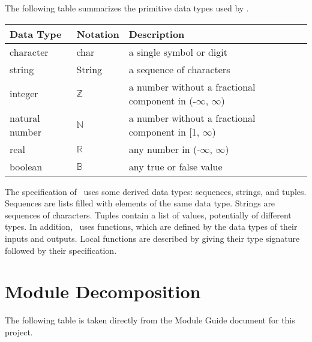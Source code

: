 \documentclass[12pt, titlepage]{article}
\begin{document}
The following table summarizes the primitive data types used by \progname. 

\begin{center}
\renewcommand{\arraystretch}{1.2}
\noindent 
\begin{tabular}{l l p{7.5cm}} 
\toprule 
\textbf{Data Type} & \textbf{Notation} & \textbf{Description}\\ 
\midrule
character & char & a single symbol or digit\\
string & String & a sequence of characters\\
integer & $\mathbb{Z}$ & a number without a fractional component in (-$\infty$, $\infty$) \\
natural number & $\mathbb{N}$ & a number without a fractional component in [1, $\infty$) \\
real & $\mathbb{R}$ & any number in (-$\infty$, $\infty$)\\
boolean & $\mathbb{B}$ & any true or false value\\
\bottomrule
\end{tabular} 
\end{center}

\noindent
The specification of \progname \ uses some derived data types: sequences, strings, and
tuples. Sequences are lists filled with elements of the same data type. Strings
are sequences of characters. Tuples contain a list of values, potentially of
different types. In addition, \progname \ uses functions, which
are defined by the data types of their inputs and outputs. Local functions are
described by giving their type signature followed by their specification.

\section{Module Decomposition}

The following table is taken directly from the Module Guide document for this project.
\end{document}
